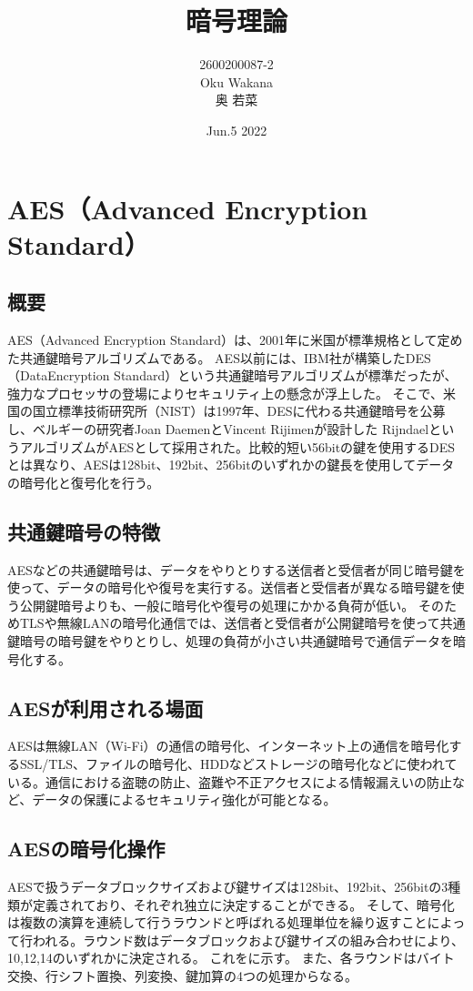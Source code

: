 \documentclass[dvipdfmx,autodetect-engine,titlepage]{jsarticle}
\title{暗号理論\\
}
\author{2600200087-2\\Oku Wakana\\奥 若菜}
\date{Jun.5 2022}
\begin{document}
\maketitle

\section{AES（Advanced Encryption Standard）}
\subsection{概要}
AES（Advanced Encryption Standard）は、2001年に米国が標準規格として定めた共通鍵暗号アルゴリズムである。
AES以前には、IBM社が構築したDES（DataEncryption Standard）という共通鍵暗号アルゴリズムが標準だったが、強力なプロセッサの登場によりセキュリティ上の懸念が浮上した。
そこで、米国の国立標準技術研究所（NIST）は1997年、DESに代わる共通鍵暗号を公募し、ベルギーの研究者Joan DaemenとVincent Rijimenが設計した
RijndaelというアルゴリズムがAESとして採用された。比較的短い56bitの鍵を使用するDESとは異なり、AESは128bit、192bit、256bitのいずれかの鍵長を使用してデータの暗号化と復号化を行う。

\subsection{共通鍵暗号の特徴}
AESなどの共通鍵暗号は、データをやりとりする送信者と受信者が同じ暗号鍵を使って、データの暗号化や復号を実行する。送信者と受信者が異なる暗号鍵を使う公開鍵暗号よりも、一般に暗号化や復号の処理にかかる負荷が低い。
そのためTLSや無線LANの暗号化通信では、送信者と受信者が公開鍵暗号を使って共通鍵暗号の暗号鍵をやりとりし、処理の負荷が小さい共通鍵暗号で通信データを暗号化する。

\subsection{AESが利用される場面}
AESは無線LAN（Wi-Fi）の通信の暗号化、インターネット上の通信を暗号化するSSL/TLS、ファイルの暗号化、HDDなどストレージの暗号化などに使われている。通信における盗聴の防止、盗難や不正アクセスによる情報漏えいの防止など、データの保護によるセキュリティ強化が可能となる。

\subsection{AESの暗号化操作}
AESで扱うデータブロックサイズおよび鍵サイズは128bit、192bit、256bitの3種類が定義されており、それぞれ独立に決定することができる。
そして、暗号化は複数の演算を連続して行うラウンドと呼ばれる処理単位を繰り返すことによって行われる。ラウンド数はデータブロックおよび鍵サイズの組み合わせにより、10,12,14のいずれかに決定される。
これをに示す。
また、各ラウンドはバイト交換、行シフト置換、列変換、鍵加算の4つの処理からなる。\\
\end{document}
